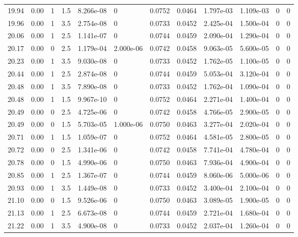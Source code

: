 \documentclass[preview]{standalone}
\begin{document}
{{{{{{{\begin{tabular}{L{1.2cm}C{1.2cm} C{0.3cm}C{0.5cm} C{1.4cm}C{1.4cm} C{1.4cm}C{1.4cm} C{1.6cm}C{1.6cm} C{1.6cm}C{1.6cm}}
  19.94  &  0.00  & 1     & 1.5 &  8.266e-08  & 0  &  0.0752&   0.0464& 1.797e-03 & 1.109e-03   &  0 & 0  \\ 
  19.96  &  0.00  & 1     & 3.5 &  2.754e-08  & 0  &  0.0733&   0.0452& 2.425e-04 & 1.500e-04   &  0 & 0  \\ 
  20.06  &  0.00  & 1     & 2.5 &  1.141e-07  & 0  &  0.0744&   0.0459& 2.090e-04 & 1.290e-04   &  0 & 0  \\ 
  20.17  &  0.00  & 0     & 2.5 &  1.179e-04  & 2.000e-06  &  0.0742&   0.0458& 9.063e-05 & 5.600e-05   &  0 & 0  \\ 
  20.23  &  0.00  & 1     & 3.5 &  9.030e-08  & 0  &  0.0733&   0.0452& 1.762e-05 & 1.100e-05   &  0 & 0  \\ 
  20.44  &  0.00  & 1     & 2.5 &  2.874e-08  & 0  &  0.0744&   0.0459& 5.053e-04 & 3.120e-04   &  0 & 0  \\ 
  20.48  &  0.00  & 1     & 3.5 &  7.890e-08  & 0  &  0.0733&   0.0452& 1.762e-04 & 1.090e-04   &  0 & 0  \\ 
  20.48  &  0.00  & 1     & 1.5 &  9.967e-10  & 0  &  0.0752&   0.0464& 2.271e-04 & 1.400e-04   &  0 & 0  \\ 
  20.49  &  0.00  & 0     & 2.5 &  4.725e-06  & 0  &  0.0742&   0.0458& 4.766e-05 & 2.900e-05   &  0 & 0  \\ 
  20.49  &  0.00  & 0     & 1.5 &  5.703e-05  & 1.000e-06  &  0.0750&   0.0463& 3.277e-04 & 2.020e-04   &  0 & 0  \\ 
  20.71  &  0.00  & 1     & 1.5 &  1.059e-07  & 0  &  0.0752&   0.0464& 4.581e-05 & 2.800e-05   &  0 & 0  \\ 
  20.72  &  0.00  & 0     & 2.5 &  1.341e-06  & 0  &  0.0742&   0.0458& 7.741e-04 & 4.780e-04   &  0 & 0  \\ 
  20.78  &  0.00  & 0     & 1.5 &  4.990e-06  & 0  &  0.0750&   0.0463& 7.936e-04 & 4.900e-04   &  0 & 0  \\ 
  20.85  &  0.00  & 1     & 2.5 &  1.367e-07  & 0  &  0.0744&   0.0459& 8.060e-06 & 5.000e-06   &  0 & 0  \\ 
  20.93  &  0.00  & 1     & 3.5 &  1.449e-08  & 0  &  0.0733&   0.0452& 3.400e-04 & 2.100e-04   &  0 & 0  \\ 
  21.10  &  0.00  & 0     & 1.5 &  9.526e-06  & 0  &  0.0750&   0.0463& 3.089e-05 & 1.900e-05   &  0 & 0  \\ 
  21.13  &  0.00  & 1     & 2.5 &  6.673e-08  & 0  &  0.0744&   0.0459& 2.721e-04 & 1.680e-04   &  0 & 0  \\ 
  21.22  &  0.00  & 1     & 3.5 &  4.900e-08  & 0  &  0.0733&   0.0452& 2.037e-04 & 1.260e-04   &  0 & 0  \\ 

\end{tabular}}}}}}}}
\end{document}
